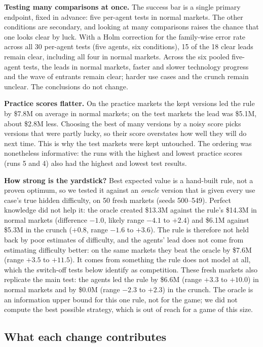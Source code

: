 \documentclass[11pt]{article}
\begin{document}
\textbf{Testing many comparisons at once.} The success bar is a single primary endpoint, fixed in advance: five per-agent tests in normal markets. The other conditions are secondary, and looking at many comparisons raises the chance that one looks clear by luck. With a Holm correction for the family-wise error rate \citep{holm1979} across all 30 per-agent tests (five agents, six conditions), 15 of the 18 clear leads remain clear, including all four in normal markets. Across the six pooled five-agent tests, the leads in normal markets, faster and slower technology progress and the wave of entrants remain clear; harder use cases and the crunch remain unclear. The conclusions do not change.

\textbf{Practice scores flatter.} On the practice markets the kept versions led the rule by \$7.8M on average in normal markets; on the test markets the lead was \$5.1M, about \$2.8M less. Choosing the best of many versions by a noisy score picks versions that were partly lucky, so their score overstates how well they will do next time. This is why the test markets were kept untouched. The ordering was nonetheless informative: the runs with the highest and lowest practice scores (runs 5 and 4) also had the highest and lowest test results.

\textbf{How strong is the yardstick?} Best expected value is a hand-built rule, not a proven optimum, so we tested it against an \emph{oracle} version that is given every use case's true hidden difficulty, on 50 fresh markets (seeds 500--549). Perfect knowledge did not help it: the oracle created \$13.3M against the rule's \$14.3M in normal markets (difference $-1.0$, likely range $-4.1$ to $+2.4$) and \$6.1M against \$5.3M in the crunch ($+0.8$, range $-1.6$ to $+3.6$). The rule is therefore not held back by poor estimates of difficulty, and the agents' lead does not come from estimating difficulty better: on the same markets they beat the oracle by \$7.6M (range $+3.5$ to $+11.5$). It comes from something the rule does not model at all, which the switch-off tests below identify as competition. These fresh markets also replicate the main test: the agents led the rule by \$6.6M (range $+3.3$ to $+10.0$) in normal markets and by \$0.0M (range $-2.3$ to $+2.3$) in the crunch. The oracle is an information upper bound for this one rule, not for the game; we did not compute the best possible strategy, which is out of reach for a game of this size.

\subsection{What each change contributes}
\label{sec:controls}
\end{document}
